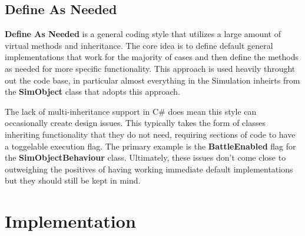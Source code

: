 \documentclass{report}
\begin{document}
\section{Define As Needed}

\textbf{Define As Needed} is a general coding style that utilizes a large amount of virtual methods and inheritance. The core idea is to define default general implementations that work for the majority of cases and then define the methods as needed for more specific functionality. This approach is used heavily throught out the code base, in particular almost everything in the Simulation inheirts from the \textbf{SimObject} class that adopts this approach.

The lack of multi-inheritance support in C\# does mean this style can occasionally create design issues. This typically takes the form of classes inheriting functionality that they do not need, requiring sections of code to have a toggelable execution flag. The primary example is the \textbf{BattleEnabled} flag for the \textbf{SimObjectBehaviour} class. Ultimately, these issues don't come close to outweighing the positives of having working immediate default implementations but they should still be kept in mind.

\chapter{Implementation}

\end{document}
